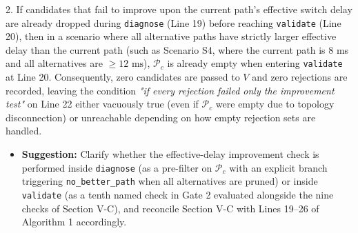 \documentclass[11pt,a4paper]{article}
\begin{document}
2. If candidates that fail to improve upon the current path's effective switch delay are already dropped during \texttt{diagnose} (Line 19) before reaching \texttt{validate} (Line 20), then in a scenario where all alternative paths have strictly larger effective delay than the current path (such as Scenario S4, where the current path is 8 ms and all alternatives are $\ge 12\text{ ms}$), $\mathcal{P}_c$ is already empty when entering \texttt{validate} at Line 20. Consequently, zero candidates are passed to $V$ and zero rejections are recorded, leaving the condition \emph{"if every rejection failed only the improvement test"} on Line 22 either vacuously true (even if $\mathcal{P}_c$ were empty due to topology disconnection) or unreachable depending on how empty rejection sets are handled.
\begin{itemize}[leftmargin=1.8em,itemsep=2pt]
\item \textbf{Suggestion:} Clarify whether the effective-delay improvement check is performed inside \texttt{diagnose} (as a pre-filter on $\mathcal{P}_c$ with an explicit branch triggering \texttt{no\_better\_path} when all alternatives are pruned) or inside \texttt{validate} (as a tenth named check in Gate 2 evaluated alongside the nine checks of Section V-C), and reconcile Section V-C with Lines 19–26 of Algorithm 1 accordingly.
\end{itemize}
\end{document}

